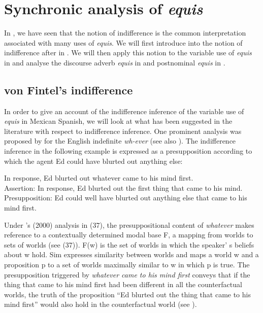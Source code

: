 \documentclass[output=paper]{langsci/langscibook}
\begin{document}
\section{Synchronic analysis of \textit{equis}}\label{sec:kellert:3}
In , we have seen that the notion of indifference is the common interpretation associated with many uses of \textit{equis}. We will first introduce into the notion of indifference after \cite{Fintel2000} in . We will then apply this notion to the variable use of \textit{equis} in  and analyse the discourse adverb \textit{equis} in  and postnominal \textit{equis} in .

\subsection{von Fintel’s indifference}\label{sec:kellert:3.1}
In order to give an account of the indifference inference of the variable use of \textit{equis} in Mexican Spanish, we will look at what has been suggested in the literature with respect to indifference inference. One prominent analysis was proposed by \citep{Fintel2000} for the English indefinite \textit{wh-ever} (see also \citealt{Condoravdi2005}). The indifference inference in the following example is expressed as a presupposition according to which the agent Ed could have blurted out anything else:

\ea In response, Ed blurted out whatever came to his mind first.\\
	Assertion: In response, Ed blurted out the first thing that came to his mind.\\
	Presupposition: Ed could well have blurted out anything else that came to his mind first.
\z

Under \citeauthor{Fintel2000}’s (2000) analysis in (37), the presuppositional content of \textit{whatever} makes reference to a contextually determined modal base F, a mapping from worlds to sets of worlds (see (37)). F(w) is the set of worlds in which the speaker' s beliefs about w hold. Sim expresses similarity between worlds and maps a world w and a proposition p to a set of worlds maximally similar to w in which p is true. The presupposition triggered by \textit{whatever came to his mind first} conveys that if the thing that came to his mind first had been different in all the counterfactual worlds, the truth of the proposition “Ed blurted out the thing that came to his mind first” would also hold in the counterfactual world (see \citealt{Condoravdi2005}).
\end{document}
